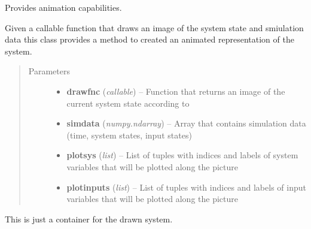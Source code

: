 \documentclass[letterpaper,10pt,english]{sphinxmanual}
\begin{document}
\begin{fulllineitems}
\label{pytrajectory:pytrajectory.utilities.Animation}
Provides animation capabilities.

Given a callable function that draws an image of the system state and smiulation data
this class provides a method to created an animated representation of the system.
\begin{quote}\begin{description}
\item[{Parameters}] \leavevmode\begin{itemize}
\item {} 
\textbf{drawfnc} (\emph{callable}) -- Function that returns an image of the current system state according to 

\item {} 
\textbf{simdata} (\emph{numpy.ndarray}) -- Array that contains simulation data (time, system states, input states)

\item {} 
\textbf{plotsys} (\emph{list}) -- List of tuples with indices and labels of system variables that will be plotted along the picture

\item {} 
\textbf{plotinputs} (\emph{list}) -- List of tuples with indices and labels of input variables that will be plotted along the picture

\end{itemize}

\end{description}\end{quote}

\begin{fulllineitems}
\label{pytrajectory:pytrajectory.utilities.Animation.Image}
This is just a container for the drawn system.

\begin{fulllineitems}
\label{pytrajectory:pytrajectory.utilities.Animation.Image.reset}
\end{fulllineitems}


\end{fulllineitems}


\end{fulllineitems}
\end{document}
